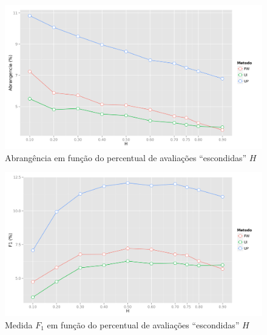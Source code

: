 \begin{figure}[htp]
    \begin{center}
    \includegraphics[width=1\textwidth]{img/recall_H}
    \end{center}
    \label{fig:recall_H}
    \caption{Abrangência em função do percentual de avaliações ``escondidas'' $H$}
\end{figure}

\begin{figure}[htp]
    \begin{center}
    \includegraphics[width=1\textwidth]{img/F1_H}
    \end{center}
    \label{fig:F1_H}
    \caption{Medida $F_1$ em função do percentual de avaliações ``escondidas'' $H$}
\end{figure}

